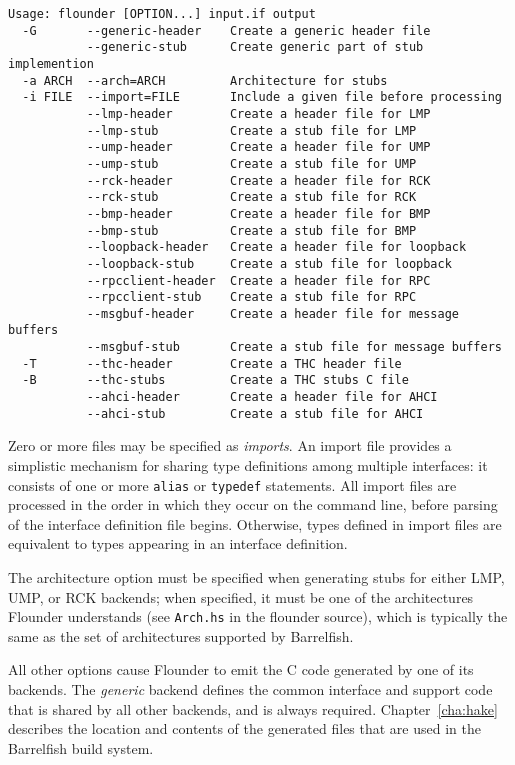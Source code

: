 \documentclass[a4paper,twoside]{report} %
\begin{document}
\begin{verbatim}
Usage: flounder [OPTION...] input.if output
  -G       --generic-header    Create a generic header file
           --generic-stub      Create generic part of stub implemention
  -a ARCH  --arch=ARCH         Architecture for stubs
  -i FILE  --import=FILE       Include a given file before processing
           --lmp-header        Create a header file for LMP
           --lmp-stub          Create a stub file for LMP
           --ump-header        Create a header file for UMP
           --ump-stub          Create a stub file for UMP
           --rck-header        Create a header file for RCK
           --rck-stub          Create a stub file for RCK
           --bmp-header        Create a header file for BMP
           --bmp-stub          Create a stub file for BMP
           --loopback-header   Create a header file for loopback
           --loopback-stub     Create a stub file for loopback
           --rpcclient-header  Create a header file for RPC
           --rpcclient-stub    Create a stub file for RPC
           --msgbuf-header     Create a header file for message buffers
           --msgbuf-stub       Create a stub file for message buffers
  -T       --thc-header        Create a THC header file
  -B       --thc-stubs         Create a THC stubs C file
           --ahci-header       Create a header file for AHCI
           --ahci-stub         Create a stub file for AHCI
\end{verbatim}

Zero or more files may be specified as \emph{imports}. An import file
provides a simplistic mechanism for sharing type definitions among multiple
interfaces: it consists of one or more \texttt{alias} or \texttt{typedef}
statements. All import files are processed in the order in which they occur on
the command line, before parsing of the interface definition file begins.
Otherwise, types defined in import files are equivalent to types appearing in
an interface definition.

The architecture option must be specified when generating stubs for either LMP,
UMP, or RCK backends; when specified, it must be one of the architectures
Flounder understands (see \texttt{Arch.hs} in the flounder source), which is
typically the same as the set of architectures supported by Barrelfish.

All other options cause Flounder to emit the C code generated by one of its
backends. The \emph{generic} backend defines the common interface and support
code that is shared by all other backends, and is always required.
Chapter~\ref{cha:hake} describes the location and contents of the generated
files that are used in the Barrelfish build system.
\end{document}
